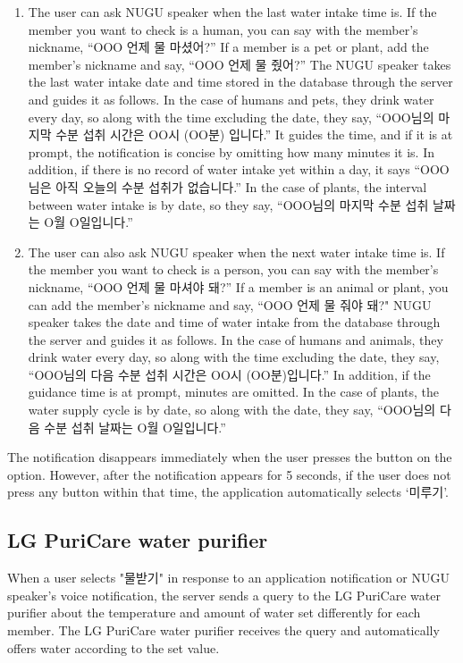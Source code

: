 \documentclass[conference]{IEEEtran}
\begin{document}
\begin{itemize}
\begin{enumerate}
\item The user can ask NUGU speaker when the last water intake time is. If the member you want to check is a human, you can say with the member's nickname, “OOO 언제 물 마셨어?” If a member is a pet or plant, add the member's nickname and say, “OOO 언제 물 줬어?” The NUGU speaker takes the last water intake date and time stored in the database through the server and guides it as follows. In the case of humans and pets, they drink water every day, so along with the time excluding the date, they say, “OOO님의 마지막 수분 섭취 시간은 OO시 (OO분) 입니다.” It guides the time, and if it is at prompt, the notification is concise by omitting how many minutes it is. In addition, if there is no record of water intake yet within a day, it says “OOO님은 아직 오늘의 수분 섭취가 없습니다.” In the case of plants, the interval between water intake is by date, so they say, “OOO님의 마지막 수분 섭취 날짜는 O월 O일입니다.”

\item The user can also ask NUGU speaker when the next water intake time is. If the member you want to check is a person, you can say with the member's nickname, “OOO 언제 물 마셔야 돼?” If a member is an animal or plant, you can add the member's nickname and say, “OOO 언제 물 줘야 돼?" NUGU speaker takes the date and time of water intake from the database through the server and guides it as follows. In the case of humans and animals, they drink water every day, so along with the time excluding the date, they say, “OOO님의 다음 수분 섭취 시간은 OO시 (OO분)입니다.” In addition, if the guidance time is at prompt, minutes are omitted. In the case of plants, the water supply cycle is by date, so along with the date, they say, “OOO님의 다음 수분 섭취 날짜는 O월 O일입니다.”
\end{enumerate}

The notification disappears immediately when the user presses the button on the option. However, after the notification appears for 5 seconds, if the user does not press any button within that time, the application automatically selects ‘미루기’.

\end{itemize}

\subsection{LG PuriCare water purifier}
\setlength{\parindent}{2ex}

When a user selects "물받기" in response to an application notification or NUGU speaker's voice notification, the server sends a query to the LG PuriCare water purifier about the temperature and amount of water set differently for each member. The LG PuriCare water purifier receives the query and automatically offers water according to the set value.
\end{document}
